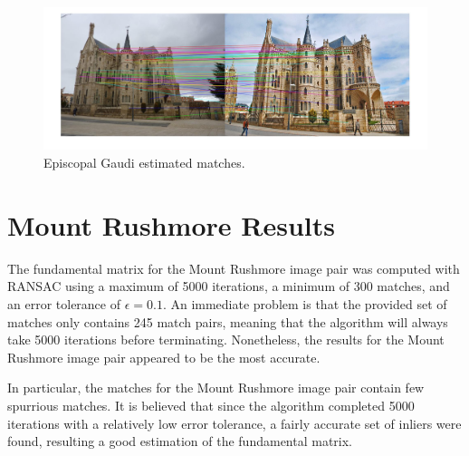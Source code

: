 \documentclass{article}
\begin{document}
\begin{center}
\begin{figure}[H]
			\includegraphics[scale = 0.2125]{episcopal_gaudi_estimated_matches.jpg}
\caption{Episcopal Gaudi estimated matches.}
\end{figure}
\end{center}




		\section{Mount Rushmore Results}

The fundamental matrix for the Mount Rushmore image pair was computed with RANSAC using a maximum of 5000 iterations, a minimum of 300 matches, and an error tolerance of $\epsilon = 0.1$. An immediate problem is that the provided set of matches only contains 245 match pairs, meaning that the algorithm will always take 5000 iterations before terminating. Nonetheless, the results for the Mount Rushmore image pair appeared to be the most accurate.

In particular, the matches for the Mount Rushmore image pair contain few spurrious matches. It is believed that since the algorithm completed 5000 iterations with a relatively low error tolerance, a fairly accurate set of inliers were found, resulting a good estimation of the fundamental matrix.
\end{document}
